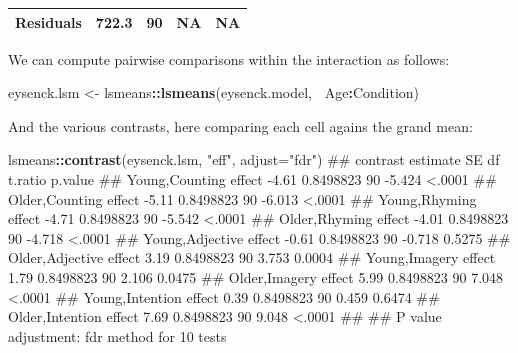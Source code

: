 \documentclass[]{article}
\newenvironment{Shaded}{\begin{snugshade}}{\end{snugshade}}
\newcommand{\KeywordTok}[1]{\textcolor[rgb]{0.13,0.29,0.53}{\textbf{#1}}}
\newcommand{\DataTypeTok}[1]{\textcolor[rgb]{0.13,0.29,0.53}{#1}}
\newcommand{\StringTok}[1]{\textcolor[rgb]{0.31,0.60,0.02}{#1}}
\newcommand{\OperatorTok}[1]{\textcolor[rgb]{0.81,0.36,0.00}{\textbf{#1}}}
\newcommand{\NormalTok}[1]{#1}
\theoremstyle{definition}
\theoremstyle{definition}
\theoremstyle{definition}
\theoremstyle{remark}
\begin{document}
\begin{longtable}[]{@{}ccccc@{}}
\begin{minipage}[t]{0.24\columnwidth}\centering\strut
\textbf{Residuals}\strut
\end{minipage} & \begin{minipage}[t]{0.11\columnwidth}\centering\strut
722.3\strut
\end{minipage} & \begin{minipage}[t]{0.06\columnwidth}\centering\strut
90\strut
\end{minipage} & \begin{minipage}[t]{0.12\columnwidth}\centering\strut
NA\strut
\end{minipage} & \begin{minipage}[t]{0.13\columnwidth}\centering\strut
NA\strut
\end{minipage}\tabularnewline
\bottomrule
\end{longtable}

We can compute pairwise comparisons within the interaction as follows:

\begin{Shaded}
\begin{Highlighting}[]
\NormalTok{eysenck.lsm <-}\StringTok{ }\NormalTok{lsmeans}\OperatorTok{::}\KeywordTok{lsmeans}\NormalTok{(eysenck.model, }\OperatorTok{~}\NormalTok{Age}\OperatorTok{:}\NormalTok{Condition)}
\end{Highlighting}
\end{Shaded}

And the various contrasts, here comparing each cell agains the grand
mean:

\begin{Shaded}
\begin{Highlighting}[]
\NormalTok{lsmeans}\OperatorTok{::}\KeywordTok{contrast}\NormalTok{(eysenck.lsm, }\StringTok{"eff"}\NormalTok{, }\DataTypeTok{adjust=}\StringTok{"fdr"}\NormalTok{)}
\NormalTok{##  contrast               estimate        SE df t.ratio p.value}
\NormalTok{##  Young,Counting effect     -4.61 0.8498823 90  -5.424  <.0001}
\NormalTok{##  Older,Counting effect     -5.11 0.8498823 90  -6.013  <.0001}
\NormalTok{##  Young,Rhyming effect      -4.71 0.8498823 90  -5.542  <.0001}
\NormalTok{##  Older,Rhyming effect      -4.01 0.8498823 90  -4.718  <.0001}
\NormalTok{##  Young,Adjective effect    -0.61 0.8498823 90  -0.718  0.5275}
\NormalTok{##  Older,Adjective effect     3.19 0.8498823 90   3.753  0.0004}
\NormalTok{##  Young,Imagery effect       1.79 0.8498823 90   2.106  0.0475}
\NormalTok{##  Older,Imagery effect       5.99 0.8498823 90   7.048  <.0001}
\NormalTok{##  Young,Intention effect     0.39 0.8498823 90   0.459  0.6474}
\NormalTok{##  Older,Intention effect     7.69 0.8498823 90   9.048  <.0001}
\NormalTok{## }
\NormalTok{## P value adjustment: fdr method for 10 tests}
\end{Highlighting}
\end{Shaded}
\end{document}
